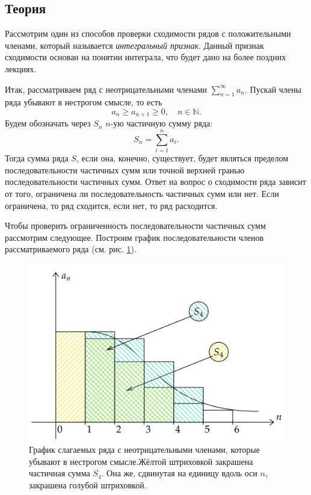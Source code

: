 \documentclass[12pt]{article}
\begin{document}
\subsection{Теория}
Рассмотрим один из способов проверки сходимости рядов с положительными членами, который называется \emph{интегральный признак}. Данный признак сходимости основан на понятии интеграла, что будет дано на более поздних лекциях.
\par
Итак, рассматриваем ряд с неотрицательными членами $\sum_{n=1}^\infty a_n$. Пускай члены ряда убывают в нестрогом смысле, то есть
\begin{equation}
    a_{n} \ge a_{n+1} \ge 0, \quad n\in \mathbb{N}.
\end{equation}
Будем обозначать через $S_n$ $n$\--ую частичную сумму ряда:
\begin{equation}
    S_n = \sum\limits_{i=1}^n a_i.
\end{equation}
Тогда сумма ряда $S$, если она, конечно, существует, будет являться пределом последовательности частичных сумм или точной верхней гранью последовательности частичных сумм. Ответ на вопрос о сходимости ряда зависит от того, ограничена ли последовательность частичных сумм или нет. Если ограничена, то ряд сходится, если нет, то ряд расходится.
\par
Чтобы проверить ограниченность последовательности частичных сумм рассмотрим следующее. Построим график последовательности членов рассматриваемого ряда (см. рис. \ref{fig:7}).
\begin{figure}[ht]
    \centering
    \includegraphics[width = 1\textwidth]{fig7.png}
    \caption{График слагаемых ряда с неотрицательными членами, которые убывают в нестрогом смысле.Жёлтой штриховкой закрашена частичная сумма $S_4$. Она же, сдвинутая на единицу вдоль оси $n$, закрашена голубой штриховкой.}
    \label{fig:7}
\end{figure}
\end{document}
